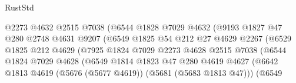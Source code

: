 \begin{lexlean}{RustStd}
\begin{coremodule}
                                      @2273
                                      @4632
                                      @2515
                                      @7038
                                      (@6544
                                        @1828
                                        @7029
                                        @4632
                                        (@9193
                                          @1827
                                          @47
                                          @280
                                          @2748
                                          @4631
                                          @9207
                                          (@6549
                                            @1825
                                            @54
                                            @212
                                            @27
                                            @4629
                                            @2267
                                            (@6529
                                              @1825
                                              @212
                                              @4629
                                              (@7925
                                                @1824
                                                @7029
                                                @2273
                                                @4628
                                                @2515
                                                @7038
                                                (@6544
                                                  @1824
                                                  @7029
                                                  @4628
                                                  (@6549
                                                    @1814
                                                    @1823
                                                    @47
                                                    @280
                                                    @4619
                                                    @4627
                                                    (@6642
                                                      @1813
                                                      @4619
                                                      (@5676 (@5677 @4619))
                                                      (@5681 (@5683 @1813 @47)))
                                                    (@6549

\end{coremodule}
\end{lexlean}
